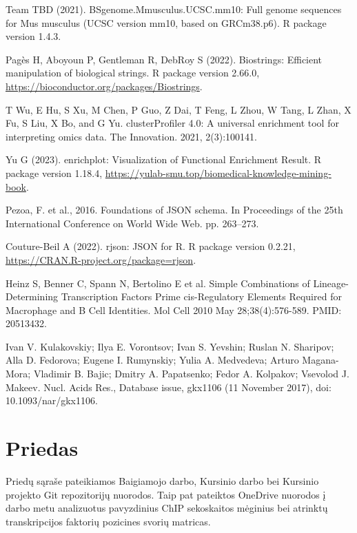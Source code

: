 \documentclass[12pt]{article}
\begin{document}
\begin{thebibliography}{99}
 Team TBD (2021). BSgenome.Mmusculus.UCSC.mm10: Full
genome sequences for Mus musculus (UCSC version mm10, based on GRCm38.p6). R
package version 1.4.3.

 Pagès H, Aboyoun P, Gentleman R, DebRoy S (2022).
Biostrings: Efficient manipulation of biological strings. R package version
2.66.0, \newline
\url{https://bioconductor.org/packages/Biostrings}.

 T Wu, E Hu, S Xu, M Chen, P Guo, Z Dai, T Feng,
L Zhou, W Tang, L Zhan, X Fu, S Liu, X Bo, and G Yu. clusterProfiler 4.0:
A universal enrichment tool for interpreting omics data. The Innovation. 2021,
2(3):100141.

 Yu G (2023). enrichplot: Visualization of Functional
Enrichment Result. R package version 1.18.4, \newline
\url{https://yulab-smu.top/biomedical-knowledge-mining-book}.

 Pezoa, F. et al., 2016. Foundations of JSON schema. In
Proceedings of the 25th International Conference on World Wide Web. pp. 263–273.

 Couture-Beil A (2022). rjson: JSON for R. R package version
0.2.21, \newline
\url{https://CRAN.R-project.org/package=rjson}.

 Heinz S, Benner C, Spann N, Bertolino E et al. Simple
Combinations of Lineage-Determining Transcription Factors Prime cis-Regulatory
Elements Required for Macrophage and B Cell Identities. Mol Cell 2010 May
28;38(4):576-589. PMID: 20513432.

 Ivan V. Kulakovskiy; Ilya E. Vorontsov; Ivan S. Yevshin;
Ruslan N. Sharipov; Alla D. Fedorova; Eugene I. Rumynskiy; Yulia A. Medvedeva;
Arturo Magana-Mora; Vladimir B. Bajic; Dmitry A. Papatsenko; Fedor A. Kolpakov;
Vsevolod J. Makeev. Nucl. Acids Res., Database issue, gkx1106
(11 November 2017), doi: 10.1093/nar/gkx1106.

\end{thebibliography}
\newpage


\section{Priedas} \label{Priedas}
Priedų sąraše pateikiamos Baigiamojo darbo, Kursinio darbo bei Kursinio projekto
Git repozitorijų nuorodos. Taip pat pateiktos OneDrive nuorodos į
darbo metu analizuotus pavyzdinius ChIP sekoskaitos mėginius bei atrinktų
transkripcijos faktorių pozicines svorių matricas.
\end{document}
